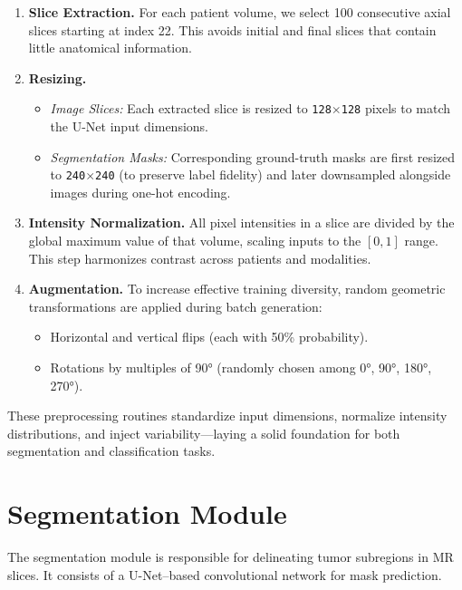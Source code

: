 \begin{enumerate}
  \item \textbf{Slice Extraction.}
        For each patient volume, we select 100 consecutive axial slices starting at index 22. This avoids initial and final slices that contain little anatomical information.

  \item \textbf{Resizing.}
        \begin{itemize}
          \item \emph{Image Slices:} Each extracted slice is resized to \texttt{128$\times$128} pixels to match the U-Net input dimensions.
          \item \emph{Segmentation Masks:} Corresponding ground-truth masks are first resized to \texttt{240$\times$240} (to preserve label fidelity) and later downsampled alongside images during one-hot encoding.
        \end{itemize}

  \item \textbf{Intensity Normalization.}
        All pixel intensities in a slice are divided by the global maximum value of that volume, scaling inputs to the \([0,1]\) range. This step harmonizes contrast across patients and modalities.

  \item \textbf{Augmentation.}
        To increase effective training diversity, random geometric transformations are applied during batch generation:
        \begin{itemize}
          \item Horizontal and vertical flips (each with 50\% probability).
          \item Rotations by multiples of 90° (randomly chosen among 0°, 90°, 180°, 270°).
        \end{itemize}
\end{enumerate}

These preprocessing routines standardize input dimensions, normalize intensity distributions, and inject variability—laying a solid foundation for both segmentation and classification tasks.

\section{Segmentation Module}
\label{sec:contribution-segmentation}

The segmentation module is responsible for delineating tumor subregions in MR slices. It consists of a U-Net–based convolutional network for mask prediction.


